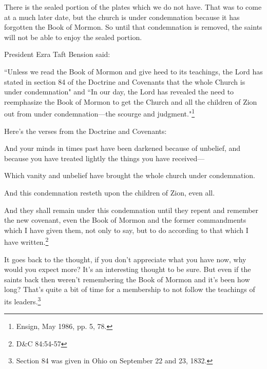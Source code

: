 There is the sealed portion of the plates which we do not have. That was to come at a
much later date, but the church is under condemnation because it has forgotten the
Book of Mormon. So until that condemnation is removed, the saints will not be able to
enjoy the sealed portion.

President Ezra Taft Bension said:

\begin{displayquote}
``Unless we read the Book of Mormon and give heed to its teachings, the Lord has stated 
in section 84 of the Doctrine and Covenants that the whole Church is under 
condemnation" and ``In our day, the Lord has revealed the need to reemphasize the 
Book of Mormon to get the Church and all the children of Zion out from under 
condemnation—the scourge and judgment."\footnote{Ensign, May 1986, pp. 5, 78.}
\end{displayquote}

Here's the verses from the Doctrine and Covenants:

\begin{displayquote}
And your minds in times past have been darkened because of unbelief, and because you 
have treated lightly the things you have received—

Which vanity and unbelief have brought the whole church under condemnation.

And this condemnation resteth upon the children of Zion, even all.

And they shall remain under this condemnation until they repent and remember the new 
covenant, even the Book of Mormon and the former commandments which I have given 
them, not only to say, but to do according to that which I have written.\footnote{
D\&C 84:54-57
}
\end{displayquote}

It goes back to the thought, if you don't appreciate what you have now, why would you
expect more? It's an interesting thought to be sure. But even if the saints back then
weren't remembering the Book of Mormon and it's been how long? That's quite a bit of
time for a membership to not follow the teachings of its leaders.\footnote{Section 84
was given in Ohio on September 22 and 23, 1832.} 